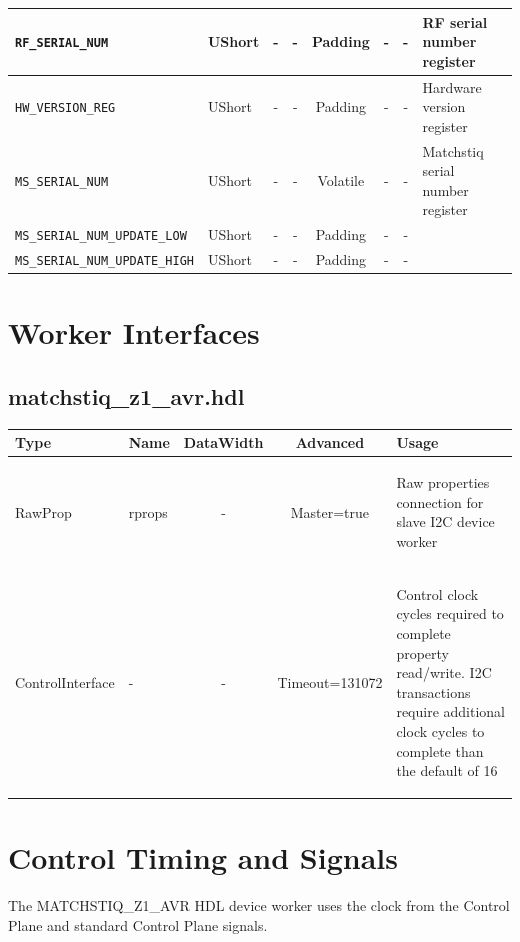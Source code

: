 \documentclass{article}
\def\comp{matchstiq\_z1\_avr}
\def\Comp{MATCHSTIQ\_Z1\_AVR}
\begin{document}
\begin{landscape}
\begin{scriptsize}
\begin{tabular}{|p{4cm}|p{1cm}|c|c|c|c|c|p{7cm}|}
			\hline
			\verb+RF_SERIAL_NUM+            & UShort  & - & -  & Padding  & -        & -        & RF serial number register \\
			\hline
			\verb+HW_VERSION_REG+           & UShort  & - & -  & Padding  & -        & -        & Hardware version register \\
			\hline
			\verb+MS_SERIAL_NUM+            & UShort  & - & -  & Volatile & -        & -        & Matchstiq serial number register \\
			\hline
			\verb+MS_SERIAL_NUM_UPDATE_LOW+ & UShort  & - & -  & Padding  & -        & -        & \\
			\hline
			\verb+MS_SERIAL_NUM_UPDATE_HIGH+& UShort  & - & -  & Padding  & -        & -        & \\
			\hline
		\end{tabular}
	\end{scriptsize}
	\section*{Worker Interfaces}
	\subsection*{\comp.hdl}
	\begin{scriptsize}
		\begin{tabular}{|M{2cm}|M{1.5cm}|c|c|M{12cm}|}
			\hline
			Type & Name & DataWidth & Advanced & Usage \\
			\hline
			RawProp
			& rprops
			& -
			& Master=true
			& \begin{flushleft}Raw properties connection for slave I2C device worker\end{flushleft}\\
			\hline
			ControlInterface
			& -
			& -
			& Timeout=131072
			& \begin{flushleft}Control clock cycles required to complete property  read/write. I2C transactions require additional clock cycles to complete than the default of 16 \end{flushleft}\\
			\hline
		\end{tabular}
	\end{scriptsize}
\end{landscape}

\section*{Control Timing and Signals}
The \Comp{} HDL device worker uses the clock from the Control Plane and standard Control Plane signals.
\end{document}
